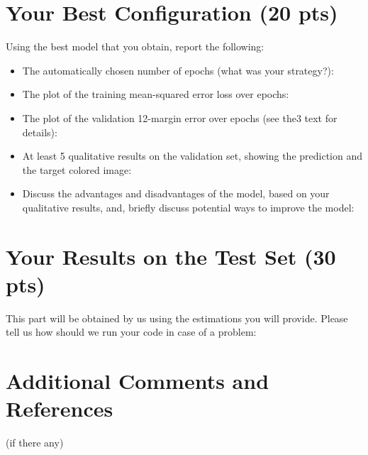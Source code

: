 \documentclass[12pt]{article}
\begin{document}
\section{Your Best Configuration (20 pts)}
Using the best model that you obtain, report the following:

\begin{itemize}
  \item The automatically chosen number of epochs (what was your strategy?):
  \item The plot of the training mean-squared error loss over epochs:
  \item The  plot  of  the  validation  12-margin  error  over  epochs (see the3 text for details):
  \item At least 5 qualitative results on the validation set, showing the prediction and the target colored image:
  \item Discuss the advantages and disadvantages of the model, based on your qualitative results, and, briefly discuss potential ways to improve the model:
\end{itemize}

\section{Your Results on the Test Set (30 pts)}
This part will be obtained by us using the estimations you will provide. Please tell us how should we run your code in case of a problem:

\section{Additional Comments and References}

(if there any)
\end{document}
